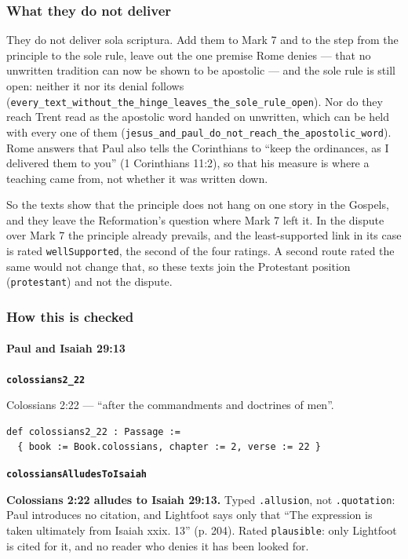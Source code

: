 \documentclass[11pt]{article}
\begin{document}
\subsubsection*{What they do not deliver}
They do not deliver sola scriptura. Add them to Mark 7 and to the step from the principle to the sole rule, leave out the one premise Rome denies — that no unwritten tradition can now be shown to be apostolic — and the sole rule is still open: neither it nor its denial follows (\texttt{every\_\allowbreak{}text\_\allowbreak{}without\_\allowbreak{}the\_\allowbreak{}hinge\_\allowbreak{}leaves\_\allowbreak{}the\_\allowbreak{}sole\_\allowbreak{}rule\_\allowbreak{}open}). Nor do they reach Trent read as the apostolic word handed on unwritten, which can be held with every one of them (\texttt{jesus\_\allowbreak{}and\_\allowbreak{}paul\_\allowbreak{}do\_\allowbreak{}not\_\allowbreak{}reach\_\allowbreak{}the\_\allowbreak{}apostolic\_\allowbreak{}word}). Rome answers that Paul also tells the Corinthians to “keep the ordinances, as I delivered them to you” (1 Corinthians 11:2), so that his measure is where a teaching came from, not whether it was written down.

So the texts show that the principle does not hang on one story in the Gospels, and they leave the Reformation’s question where Mark 7 left it. In the dispute over Mark 7 the principle already prevails, and the least-supported link in its case is rated \texttt{well\allowbreak{}Supported}, the second of the four ratings. A second route rated the same would not change that, so these texts join the Protestant position (\texttt{protestant}) and not the dispute.

\subsubsection*{How this is checked}
\paragraph*{Paul and Isaiah 29:13}
\leavevmode\par\nobreak
\par\medskip\noindent\textbf{\texttt{colossians2\_\allowbreak{}22}}\par\nobreak\noindent
Colossians 2:22 — “after the commandments and doctrines of men”.

{\small\begin{verbatim}
def colossians2_22 : Passage :=
  { book := Book.colossians, chapter := 2, verse := 22 }
\end{verbatim}}
\par\medskip\noindent\textbf{\texttt{colossians\allowbreak{}Alludes\allowbreak{}To\allowbreak{}Isaiah}}\par\nobreak\noindent
\textbf{Colossians 2:22 alludes to Isaiah 29:13.} Typed \texttt{.allusion}, not \texttt{.quotation}: Paul introduces no citation, and Lightfoot says only that “The expression is taken ultimately from Isaiah xxix. 13” (p. 204). Rated \texttt{plausible}: only Lightfoot is cited for it, and no reader who denies it has been looked for.
\end{document}
